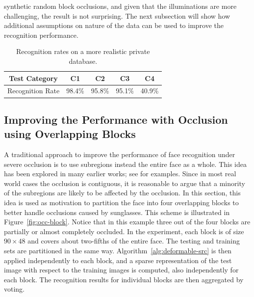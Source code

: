 synthetic random block occlusions, and given that the
illuminations are more challenging, the result is not
surprising. The next subsection will show how additional
assumptions on nature of the data can be used to improve 
the recognition performance.
\begin{table}[h]
\centering \caption{Recognition rates on a more realistic
private database.}
\begin{tabular}{|c|c|c|c|c| }
\hline
Test Category & C1 & C2 & C3 & C4  \\
\hline
\hline
Recognition Rate & 98.4\% & 95.8\% & 95.1\% & 40.9\% \\
\hline
\end{tabular}
\label{tab:UIUC-recognition}
\end{table}

\subsection{Improving the Performance with Occlusion using Overlapping Blocks}
\label{sec:overlapping_blocks}
%
A traditional approach to improve the performance of face recognition under
severe occlusion is to use subregions instead the entire face as a whole. This
idea has been explored in many earlier works; see \cite{Pentland1994-CVPR,
Wright2009-PAMI} for examples. Since in most real world cases the occlusion is
contiguous, it is reasonable to argue that a minority of the subregions are
likely to be affected by the occlusion. In this section, this idea is used
as motivation to 
partition the face into four overlapping blocks to better handle
occlusions caused by sunglasses. This scheme is illustrated in Figure~\ref{fig:occ-block}. Notice
that in this example three out of the four blocks are partially or almost
completely occluded. In the experiment, each block is of size $90\times 48$ and
covers about two-fifths of the entire face. The testing and training sets are
partitioned in the same way. 
Algorithm~\ref{alg:deformable-src} is then applied independently to each block,
and a sparse representation of the test image with respect to the training images
is computed, also independently for each block.
The recognition results for individual blocks are then aggregated by voting.

